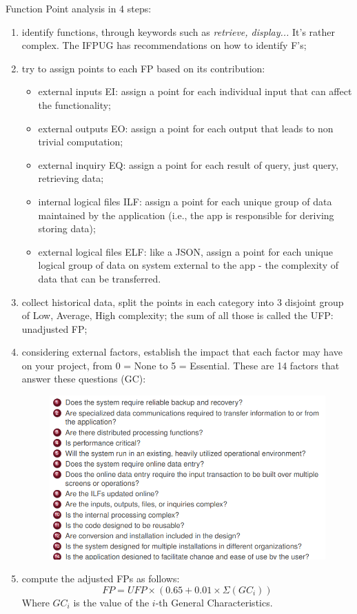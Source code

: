 \noindent Function Point analysis in 4 steps:
\begin{enumerate}
    \item identify functions, through keywords such as \textit{retrieve, display...} It's rather complex. The IFPUG has recommendations on how to identify F's;
    \item try to assign points to each FP based on its contribution:
    \begin{itemize}
        \item external inputs EI: assign a point for each individual input that can affect the functionality;
        \item external outputs EO: assign a point for each output that leads to non trivial computation;
        \item external inquiry EQ: assign a point for each result of query, just query, retrieving data;
        \item internal logical files ILF: assign a point for each unique group of data maintained by the application (i.e., the app is responsible for deriving storing data);
        \item external logical files ELF: like a JSON, assign a point for each unique logical group of data on system external to the app - the complexity of data that can be transferred.
    \end{itemize}
    \item collect historical data, split the points in each category into 3 disjoint group of Low, Average, High complexity; the sum of all those is called the UFP: unadjusted FP;
    \item considering external factors, establish the impact that each factor may have on your project, from 0 = None to 5 = Essential. These are 14 factors that answer these questions (GC):
    
    \begin{figure} [H]
        \centering
        \includegraphics[width=0.75\linewidth]{Figures/05/fp1.png}
    \end{figure}

\item compute the adjusted FPs as follows:
\[FP = UFP \times (0.65 + 0.01 \times \Sigma(GC_i))\]
Where $GC_i$ is the value of the $i$-th General Characteristics.
\end{enumerate}

